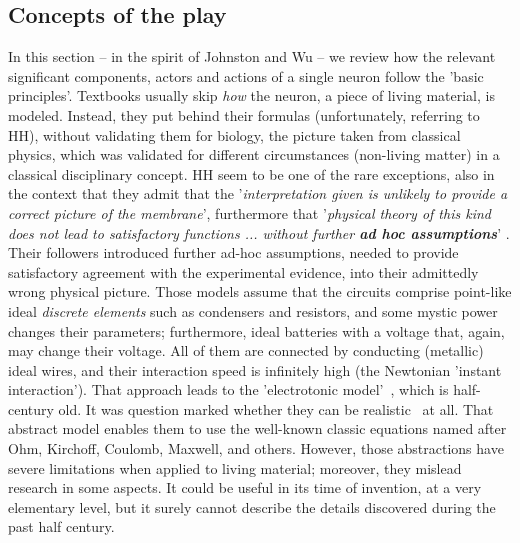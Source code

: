 
\subsection[Concepts]{Concepts of the play\label{Single-Concepts}}




In this section -- in the spirit of  Johnston and Wu \cite{JohnstonWuNeurophysiology:1995} --
we review how the relevant significant components, actors and actions of a single neuron follow the 'basic principles'.
Textbooks
usually skip \textit{how} the neuron, a piece of living material, is modeled. Instead, they put  behind their formulas (unfortunately, referring to \gls{HH}), without validating them for biology, the picture taken
from classical physics, which was validated for different circumstances (non-living matter) in a classical disciplinary concept.
\gls{HH}
  seem to be one of the rare exceptions,
also in the context that they admit that the '\textit{interpretation given is unlikely to provide a correct picture of the
	membrane}', furthermore that '\textit{physical theory of this kind does not lead to
	satisfactory functions ... without further \textbf{ad hoc assumptions}}'  \cite{HodgkinHuxley:1952}.
Their followers introduced further ad-hoc assumptions,
needed to provide satisfactory agreement with the
experimental evidence, into their admittedly wrong physical picture. Those  models assume that the circuits comprise point-like
ideal \textit{discrete elements}
such as condensers and resistors, and some mystic power changes their parameters; furthermore, ideal batteries with a voltage that,  again,  may change their voltage. All of them
are connected by conducting  (metallic) ideal wires,
and their interaction speed is infinitely high (the Newtonian 'instant interaction').
That approach leads to the 'electrotonic model'~\cite{ElectrotonicNeuronModel:1978}, which is half-century old.
It was question marked whether they can be realistic~\cite{RealisticNeuronalModeling:2016} at all.
That abstract model enables them to use the well-known classic equations named after
Ohm, Kirchoff, Coulomb, Maxwell, and others. However, those abstractions have severe limitations when applied to living material; moreover, they mislead research in some aspects. It could be useful in its time of invention, at a very elementary level, but it surely cannot describe the details discovered
during the past half century.



